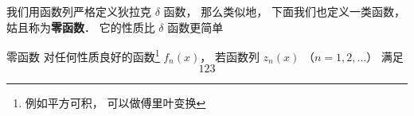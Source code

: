 
\begin{issues}
\issueDraft
{}
\end{issues}

我们用函数列严格定义狄拉克 $\delta$ 函数， 那么类似地， 下面我们也定义一类函数， 姑且称为\textbf{零函数}． 它的性质比 $\delta$ 函数更简单
\begin{definition}{零函数}
对任何性质良好的函数\footnote{例如平方可积， 可以做傅里叶变换} $f_n(x)$， 若函数列 $z_n(x)$ （$n = 1, 2, \dots$） 满足
\begin{equation}
123
\end{equation}
\end{definition}
